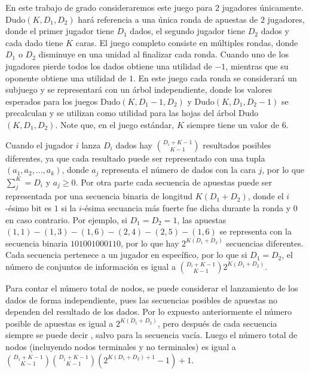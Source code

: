 En este trabajo de grado consideraremos este juego para $2$ jugadores únicamente. Dudo$(K, D_1, D_2)$ hará referencia a una única ronda de apuestas de $2$ jugadores, donde el primer jugador tiene $D_1$ dados, el segundo jugador tiene $D_2$ dados y cada dado tiene $K$ caras. El juego completo consiste en múltiples rondas, donde $D_1$ o $D_2$ disminuye en una unidad al finalizar cada ronda. Cuando uno de los jugadores pierde todos los dados obtiene una utilidad de $-1$, mientras que su oponente obtiene una utilidad de $1$. En este juego cada ronda se considerará un subjuego y se representará con un árbol independiente, donde los valores esperados para los juegos Dudo$(K, D_1 - 1, D_2)$ y Dudo$(K, D_1, D_2 - 1)$ se precalculan y se utilizan como utilidad para las hojas del árbol Dudo$(K, D_1, D_2)$. Note que, en el juego estándar, $K$ siempre tiene un valor de $6$.

Cuando el jugador $i$ lanza $D_i$ dados hay $\binom{D_i+K-1}{K-1}$ resultados posibles diferentes, ya que cada resultado puede ser representado con una tupla $(a_1, a_2, ..., a_k)$, donde $a_j$ representa el número de dados con la cara $j$, por lo que $\sum_j^K = D_i$ y $a_j \geq 0$. Por otra parte cada secuencia de apuestas puede ser representada por una secuencia binaria de longitud $K(D_1 + D_2)$, donde el $i$-ésimo bit es $1$ si la $i$-ésima secuancia más fuerte fue dicha durante la ronda y $0$ en caso contrario. Por ejemplo, si $D_1 = D_2 = 1$, las apuestas $(1, 1)-(1, 3)-(1, 6)-(2, 4)-(2, 5)-(1, 6)$ se representa con la secuencia binaria $101001000110$, por lo que hay $2^{K(D_1 + D_2)}$ secuencias diferentes. Cada secuencia pertenece a un jugador en específico, por lo que si $D_1 = D_2$, el número de conjuntos de información  es igual a  $\binom{D_i+K-1}{K-1}2^{K(D_1 + D_2)}$.

Para contar el número total de nodos, se puede considerar el lanzamiento de los dados de forma independiente, pues las secuencias posibles de apuestas no dependen del resultado de los dados. Por lo expuesto anteriormente el número posible de apuestas es igual a $2^{K(D_1+D_2)}$, pero después de cada secuencia siempre se puede decir , salvo para la secuencia vacía. Luego el número total de nodos (incluyendo nodos terminales y no terminales) es igual a $\binom{D_1+K-1}{K-1}\binom{D_1+K-1}{K-1}(2^{K(D_1+D_2)+1}-1)+1$.

